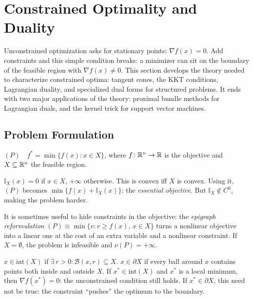 \section{Constrained Optimality and Duality}\label{sec:constrained-theory}

Unconstrained optimization asks for stationary points: $\nabla f(x) = 0$.
Add constraints and this simple condition breaks: a minimizer can sit on the boundary of the feasible region with $\nabla f(x) \neq 0$.
This section develops the theory needed to characterize constrained optima: tangent cones, the KKT conditions, Lagrangian duality, and specialized dual forms for structured problems.
It ends with two major applications of the theory: proximal bundle methods for Lagrangian duals, and the kernel trick for support vector machines.


\subsection{Problem Formulation}\label{sec:constrained-formulation}

\begin{definition}\label{def:constrained-P}
	$(P) \quad f^* = \min\{f(x) : x \in X\}$,
	where $f \colon \mathbb{R}^n \to \mathbb{R}$ is the objective and $X \subseteq \mathbb{R}^n$ the feasible region.
\end{definition}

\begin{definition}\label{def:indicator}
	$\mathbb{I}_X(x) = 0$ if $x \in X$, $+\infty$ otherwise.
	This is convex iff $X$ is convex.
	Using it, $(P)$ becomes $\min\{f(x) + \mathbb{I}_X(x)\}$: the \emph{essential objective}.
	But $\mathbb{I}_X \notin C^0$, making the problem harder.
\end{definition}

It is sometimes useful to hide constraints in the objective: the \emph{epigraph reformulation} $(P) \equiv \min\{v : v \geq f(x),\, x \in X\}$ turns a nonlinear objective into a linear one at the cost of an extra variable and a nonlinear constraint.
If $X = \emptyset$, the problem is infeasible and $\nu(P) = +\infty$.

\begin{definition}\label{def:interior-boundary}
	$x \in \mathrm{int}(X)$ if $\exists\, r > 0 : \mathcal{B}(x, r) \subseteq X$.
	$x \in \partial X$ if every ball around $x$ contains points both inside and outside $X$.
	If $x^* \in \mathrm{int}(X)$ and $x^*$ is a local minimum, then $\nabla f(x^*) = 0$: the unconstrained condition still holds.
	If $x^* \in \partial X$, this need not be true: the constraint ``pushes'' the optimum to the boundary.
\end{definition}

